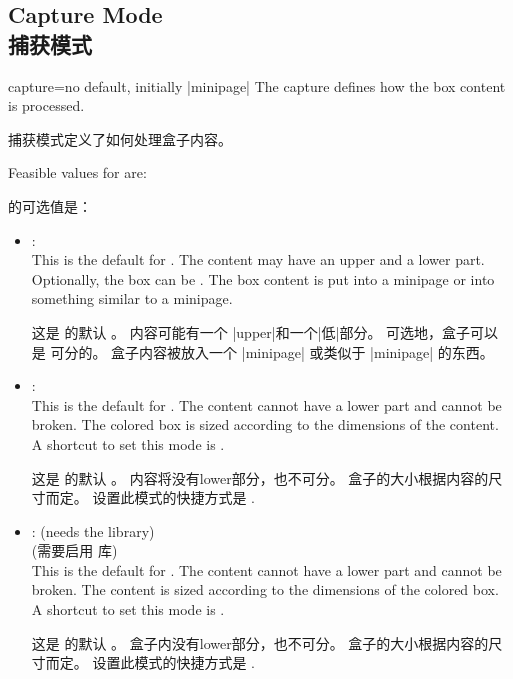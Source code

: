 \subsection{Capture Mode\\捕获模式}\label{subsec:capture}
\begin{docTcbKey}{capture}{=}{no default, initially |minipage|}
The capture  defines how the box content is processed.

捕获模式定义了如何处理盒子内容。

Feasible values for  are:

 的可选值是：
\begin{itemize}
\item{}:\\
  This is the default  for .
  The content may have an upper and a lower part. 
  Optionally, the box
  can be . The box content is put into a
  minipage or into something similar to a minipage.

这是  的默认  。%
内容可能有一个 |upper|和一个|低|部分。%
可选地，盒子可以是  可分的。
盒子内容被放入一个 |minipage| 或类似于 |minipage| 的东西。
\item{}:\\
  This is the default  for . The content cannot have
  a lower part and cannot be broken. The colored box is sized according
  to the dimensions of the content.
  A shortcut to set this mode is .

这是  的默认  。%
内容将没有lower部分，也不可分。%
盒子的大小根据内容的尺寸而定。%
设置此模式的快捷方式是 .
\item{}:%
 (needs the  library)\\

 (需要启用  库)\\
 
 This is the default  for . The content cannot have
  a lower part and cannot be broken.
  The content is sized according to the dimensions of the colored box.
  A shortcut to set this mode is .

这是  的默认 。 %
盒子内没有lower部分，也不可分。
盒子的大小根据内容的尺寸而定。%
设置此模式的快捷方式是 .
\end{itemize}


\end{docTcbKey}
